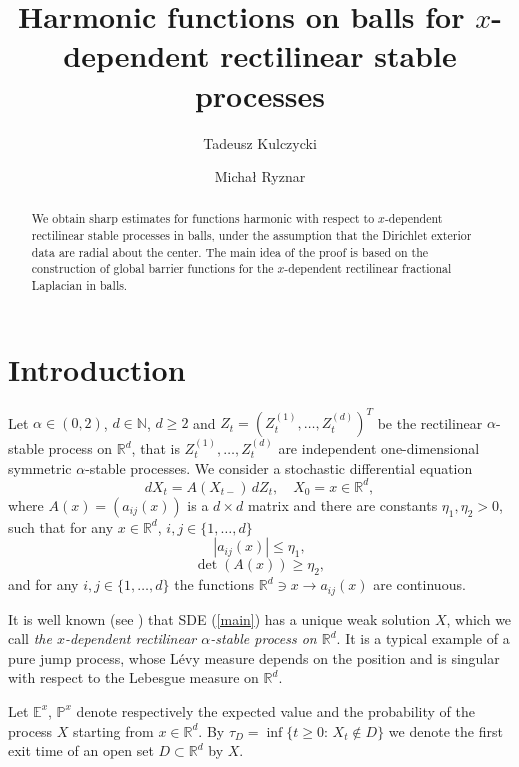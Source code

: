 \documentclass[a4paper,12pt,reqno]{amsart}
\title[Harmonic functions for $x$-dependent rectilinear stable processes]{Harmonic functions on balls for $x$-dependent rectilinear stable processes}
\author[T. Kulczycki]{Tadeusz Kulczycki}
\author[M. Ryznar]{Micha{\l} Ryznar}
\theoremstyle{definition}
\theoremstyle{remark}
\newcommand{\Ee}{\mathds{E}} %
\newcommand{\Pp}{\mathds{P}} %
\newcommand{\R}{\mathds{R}}
\newcommand{\N}{{\mathds{N}}}
\begin{document}
\begin{abstract} We obtain sharp estimates for functions harmonic with respect to $x$-dependent rectilinear stable processes in balls, under the assumption that the Dirichlet exterior data are radial about the center. The main idea of the proof is based on the construction of global barrier functions for the $x$-dependent rectilinear fractional Laplacian in balls.
\end{abstract}

\maketitle

\section{Introduction}
Let $\alpha \in (0,2)$, $d \in \N$, $d \ge 2$ and $Z_t = (Z_t^{(1)},\ldots,Z_t^{(d)})^T$ be the rectilinear $\alpha$-stable process on $\R^d$, that is $Z_t^{(1)}, \ldots, Z_t^{(d)}$ are independent one-dimensional symmetric  $\alpha$-stable processes. We consider a stochastic differential equation
\begin{equation}
\label{main}
dX_t = A(X_{t-}) \, dZ_t, \quad X_0 = x \in \R^d, 
\end{equation}
where $A(x) = (a_{ij}(x))$ is a $d \times d$ matrix and there are constants $\eta_1, \eta_2 > 0$, such that for any $x \in \R^d$, $i, j \in \{1,\ldots,d\}$
\begin{equation*}
|a_{ij}(x)| \le \eta_1,
\end{equation*}
\begin{equation*}
\det(A(x)) \ge \eta_2,
\end{equation*}
and for any $i, j \in \{1,\ldots,d\}$ the functions $\R^d \ni x \to a_{ij}(x)$ are continuous.
 
It is well known (see \cite{BC2006}) that SDE (\ref{main}) has a unique weak solution $X$, which we call {\it the $x$-dependent rectilinear $\alpha$-stable process on $\R^d$}. It is a typical example of a pure jump process, whose L{\'e}vy measure depends on the position and is singular with respect to the Lebesgue measure on $\R^d$. 

Let $\Ee^x$, $\Pp^x$ denote respectively the expected value and the probability of the process $X$ starting from $x \in \R^d$. By $\tau_D = \inf\{t \ge 0:\, X_t \notin D \}$ we denote the first exit time of an open set $D \subset \R^d$ by $X$.
\end{document}
